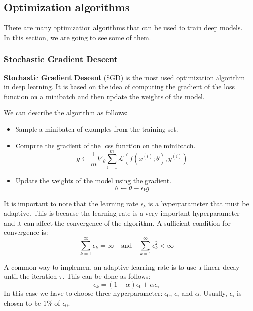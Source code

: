 \subsection{Optimization algorithms}
There are many optimization algorithms that can be used to train deep models.
In this section, we are going to see some of them.
\subsubsection{Stochastic Gradient Descent}
\textbf{Stochastic Gradient Descent} (SGD) is the most used optimization algorithm
in deep learning. It is based on the idea of computing the gradient of the loss
function on a minibatch and then update the weights of the model.

We can describe the algorithm as follows:
\begin{itemize}
    \item Sample a minibatch of examples from the training set.
    \item Compute the gradient of the loss function on the minibatch.
          \begin{equation}
              g \gets \frac{1}{m} \nabla_\theta \sum_{i=1}^m \mathcal{L}(f(x^{(i)}; \theta), y^{(i)})
          \end{equation}
    \item Update the weights of the model using the gradient.
          \begin{equation}
              \theta \gets \theta - \epsilon_k g
          \end{equation}
\end{itemize}
It is important to note that the learning rate $\epsilon_k$ is a hyperparameter
that must be adaptive. This is because the learning rate is a very important
hyperparameter and it can affect the convergence of the algorithm. A sufficient
condition for convergence is:
\begin{equation*}
    \sum_{k=1}^\infty \epsilon_k = \infty \quad \text{and} \quad \sum_{k=1}^\infty \epsilon_k^2 < \infty
\end{equation*}

A common way to implement an adaptive learning rate is to use a linear decay
until the iteration $\tau$. This can be done as follows:
\begin{equation}
    \epsilon_k = \left(1 - \alpha\right)\epsilon_0 + \alpha \epsilon_\tau
\end{equation}
In this case we have to choose three hyperparameter: $\epsilon_0$, $\epsilon_\tau$
and $\alpha$. Usually, $\epsilon_\tau$ is chosen to be $1\%$ of $\epsilon_0$.

